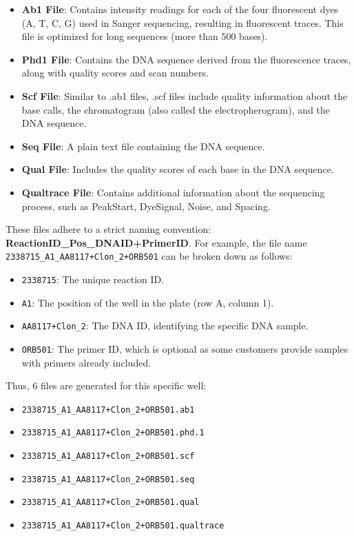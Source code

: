 \begin{itemize}
  \item \textbf{Ab1 File}: Contains intensity readings for each of the four fluorescent dyes (A, T, C, G) used in Sanger sequencing, resulting in fluorescent traces. This file is optimized for long sequences (more than 500 bases).
  \item \textbf{Phd1 File}: Contains the DNA sequence derived from the fluorescence traces, along with quality scores and scan numbers.
  \item \textbf{Scf File}: Similar to .ab1 files, .scf files include quality information about the base calls, the chromatogram (also called the electropherogram), and the DNA sequence.
  \item \textbf{Seq File}: A plain text file containing the DNA sequence.
  \item \textbf{Qual File}: Includes the quality scores of each base in the DNA sequence.
  \item \textbf{Qualtrace File}: Contains additional information about the sequencing process, such as PeakStart, DyeSignal, Noise, and Spacing.
\end{itemize}

These files adhere to a strict naming convention: \textbf{ReactionID\_Pos\_DNAID+PrimerID}. 
For example, the file name \texttt{2338715\_A1\_AA8117+Clon\_2+ORB501} can be broken down as follows:
\begin{itemize}
  \item \texttt{2338715}: The unique reaction ID.
  \item \texttt{A1}: The position of the well in the plate (row A, column 1).
  \item \texttt{AA8117+Clon\_2}: The DNA ID, identifying the specific DNA sample.
  \item \texttt{ORB501}: The primer ID, which is optional as some customers provide samples with primers already included.
\end{itemize}
Thus, 6 files are generated for this specific well: 
\begin{itemize}
  \item \texttt{2338715\_A1\_AA8117+Clon\_2+ORB501.ab1}
  \item \texttt{2338715\_A1\_AA8117+Clon\_2+ORB501.phd.1}
  \item \texttt{2338715\_A1\_AA8117+Clon\_2+ORB501.scf}
  \item \texttt{2338715\_A1\_AA8117+Clon\_2+ORB501.seq}
  \item \texttt{2338715\_A1\_AA8117+Clon\_2+ORB501.qual}
  \item \texttt{2338715\_A1\_AA8117+Clon\_2+ORB501.qualtrace}
\end{itemize}

